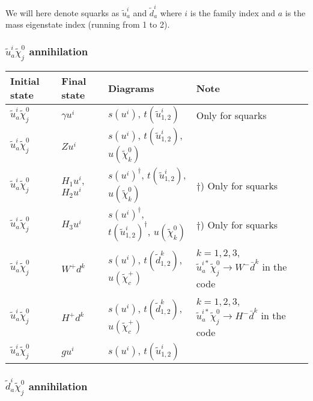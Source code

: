 \smallskip


We will here denote squarks as $\tilde{u}^i_a$ and $\tilde{d}^i_a$ where $i$ is the family index and $a$ is the mass eigenstate index (running from 1 to 2).

\subsubsection{$\tilde{u}^i_{a} \tilde{\chi}_{j}^{0}$ annihilation}

\begin{center}
\begin{tabular}{llll} \hline
{\bfseries Initial state} & {\bfseries Final state} &
{\bfseries Diagrams} & {\bfseries Note} \\ \hline \tabspace
$\tilde{u}^i_a \tilde{\chi}_{j}^0$ & $\gamma u^i$ &
$s(u^{i})$, $t(\tilde{u}^i_{1,2})$ 
& Only for squarks \\
$\tilde{u}^i_a \tilde{\chi}_{j}^0$ & $Z u^i$ &
$s(u^{i})$, $t(\tilde{u}^i_{1,2})$, $u(\tilde{\chi}_k^0)$ \\
$\tilde{u}^i_a \tilde{\chi}_{j}^0$ & $H_{1} u^i$, $H_{2} u^i$ &
$s(u^{i})^\dagger$, $t(\tilde{u}^i_{1,2})$, $u(\tilde{\chi}_k^0)$
& $\dagger$) Only for squarks \\
$\tilde{u}^i_a \tilde{\chi}_{j}^0$ & $H_{3}u^i$  &
$s(u^{i})^\dagger$, $t(\tilde{u}^i_{1,2})^\dagger$, $u(\tilde{\chi}_k^0)$
& $\dagger$) Only for squarks  \\ 
$\tilde{u}^i_a \tilde{\chi}_{j}^0$ & $W^+ d^k$  &
$s(u^i)$, $t(\tilde{d}^k_{1,2})$, $u(\tilde{\chi}_c^+)$ 
& \parbox[t]{4cm}{$k=1,2,3$, $\tilde{u}^{i*}_a \tilde{\chi}_{j}^0 \to W^- \bar{d}^k$ in the code} \\
$\tilde{u}^i_a \tilde{\chi}_{j}^0$ & $H^+ d^k$  &
$s(u^i)$, $t(\tilde{d}^k_{1,2})$, $u(\tilde{\chi}_c^+)$
& \parbox[t]{4cm}{$k=1,2,3$, $\tilde{u}^{i*}_a \tilde{\chi}_{j}^0 \to H^- \bar{d}^k$ in the code} \\ 
$\tilde{u}^i_a \tilde{\chi}_{j}^0$ & $g u^i$  &
$s(u^i)$, $t(\tilde{u}^i_{1,2})$ \\ \hline
\end{tabular}
\end{center}

\subsubsection{$\tilde{d}^i_{a} \tilde{\chi}_{j}^{0}$ annihilation}

